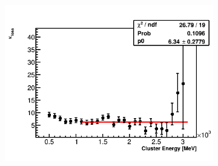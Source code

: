 \begin{landscape}
\begin{figure}[h]
    \hspace{1cm}
    \begin{subfigure}[t]{0.4\textwidth}
        \centering
        \includegraphics[width=\textwidth]{TMethod_kappa_loss_Vs_EBin_Canv_HK-7p5}
        \caption{}
    \end{subfigure}


\end{figure}
\end{landscape}
